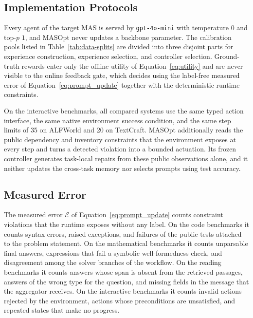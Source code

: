 \documentclass{article}
\theoremstyle{definition}
\begin{document}
\subsection{Implementation Protocols}
\label{app:impl}

Every agent of the target MAS is served by \texttt{gpt-4o-mini} with temperature $0$ and top-$p$ $1$, and MASOpt never updates a backbone parameter. The calibration pools listed in Table~\ref{tab:data-splits} are divided into three disjoint parts for experience construction, experience selection, and controller selection. Ground-truth rewards enter only the offline utility of Equation~\ref{eq:utility} and are never visible to the online feedback gate, which decides using the label-free measured error of Equation~\ref{eq:prompt_update} together with the deterministic runtime constraints.

On the interactive benchmarks, all compared systems use the same typed action interface, the same native environment success condition, and the same step limits of 35 on ALFWorld and 20 on TextCraft. MASOpt additionally reads the public dependency and inventory constraints that the environment exposes at every step and turns a detected violation into a bounded actuation. Its frozen controller generates task-local repairs from these public observations alone, and it neither updates the cross-task memory nor selects prompts using test accuracy.

\subsection{Measured Error}
\label{app:error}

The measured error $\mathcal{E}$ of Equation~\ref{eq:prompt_update} counts constraint violations that the runtime exposes without any label. On the code benchmarks it counts syntax errors, raised exceptions, and failures of the public tests attached to the problem statement. On the mathematical benchmarks it counts unparsable final answers, expressions that fail a symbolic well-formedness check, and disagreement among the solver branches of the workflow. On the reading benchmarks it counts answers whose span is absent from the retrieved passages, answers of the wrong type for the question, and missing fields in the message that the aggregator receives. On the interactive benchmarks it counts invalid actions rejected by the environment, actions whose preconditions are unsatisfied, and repeated states that make no progress.
\end{document}
